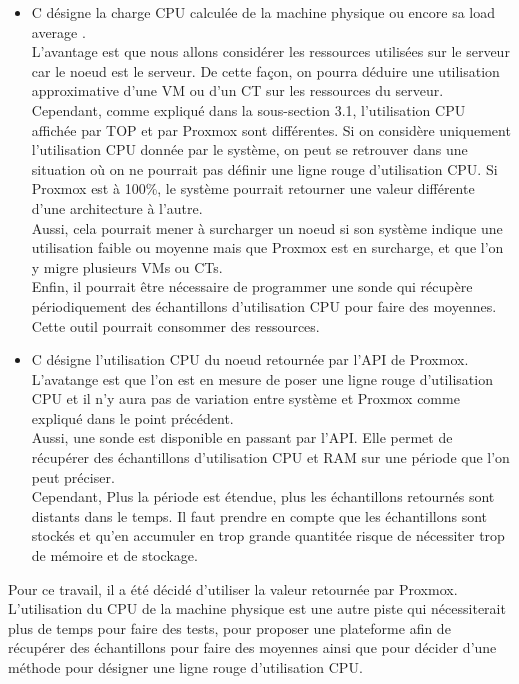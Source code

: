 \documentclass[14pt]{extarticle}
\begin{document}
    \begin{itemize}[nosep,label=\textendash]
        \item C désigne la charge CPU calculée de la machine physique ou encore sa load average \cite{load_average}.\\
        L'avantage est que nous allons considérer les ressources utilisées sur le serveur car le noeud est le serveur. De cette façon, on pourra déduire une utilisation approximative d'une VM ou d'un CT sur les ressources du serveur.\\
        Cependant, comme expliqué dans la sous-section 3.1, l'utilisation CPU affichée par TOP et par Proxmox sont différentes. Si on considère uniquement l'utilisation CPU donnée par le système, on peut se retrouver dans une situation où on ne pourrait pas définir une ligne rouge d'utilisation CPU. Si Proxmox est à 100\%, le système pourrait retourner une valeur différente d'une architecture à l'autre.\\
        Aussi, cela pourrait mener à surcharger un noeud si son système indique une utilisation faible ou moyenne mais que Proxmox est en surcharge, et que l'on y migre plusieurs VMs ou CTs.\\
        Enfin, il pourrait être nécessaire de programmer une sonde qui récupère périodiquement des échantillons d'utilisation CPU pour faire des moyennes. Cette outil pourrait consommer des ressources.
        \item C désigne l'utilisation CPU du noeud retournée par l'API de Proxmox.
        L'avatange est que l'on est en mesure de poser une ligne rouge d'utilisation CPU et il n'y aura pas de variation entre système et Proxmox comme expliqué dans le point précédent.\\
        Aussi, une sonde est disponible en passant par l'API. Elle permet de récupérer des échantillons d'utilisation CPU et RAM sur une période que l'on peut préciser.\\
        Cependant, Plus la période est étendue, plus les échantillons retournés sont distants dans le temps. Il faut prendre en compte que les échantillons sont stockés et qu'en accumuler en trop grande quantitée risque de nécessiter trop de mémoire et de stockage.
    \end{itemize}
    Pour ce travail, il a été décidé d'utiliser la valeur retournée par Proxmox. L'utilisation du CPU de la machine physique est une autre piste qui nécessiterait plus de temps pour faire des tests, pour proposer une plateforme afin de récupérer des échantillons pour faire des moyennes ainsi que pour décider d'une méthode pour désigner une ligne rouge d'utilisation CPU.
    \newpage
\end{document}
